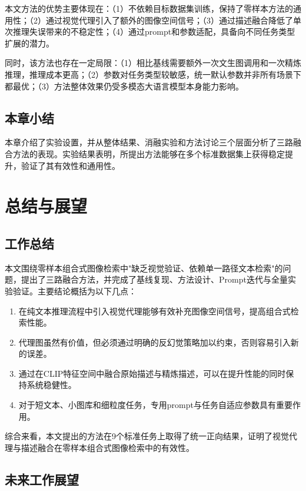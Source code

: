 \documentclass[12pt,a4paper,UTF8,oneside,openany]{ctexrep}
\begin{document}
本文方法的优势主要体现在：（1）不依赖目标数据集训练，保持了零样本方法的通用性；（2）通过视觉代理引入了额外的图像空间信号；（3）通过描述融合降低了单次推理失误带来的不稳定性；（4）通过prompt和参数适配，具备向不同任务类型扩展的潜力。

同时，该方法也存在一定局限：（1）相比基线需要额外一次文生图调用和一次精炼推理，推理成本更高；（2）参数对任务类型较敏感，统一默认参数并非所有场景下都最优；（3）方法整体效果仍受多模态大语言模型本身能力影响。

\section{本章小结}

本章介绍了实验设置，并从整体结果、消融实验和方法讨论三个层面分析了三路融合方法的表现。实验结果表明，所提出方法能够在多个标准数据集上获得稳定提升，验证了其有效性和通用性。


\chapter{总结与展望}

\section{工作总结}

本文围绕零样本组合式图像检索中"缺乏视觉验证、依赖单一路径文本检索"的问题，提出了三路融合方法，并完成了基线复现、方法设计、Prompt迭代与全量实验验证。主要结论概括为以下几点：
\begin{enumerate}[leftmargin=2\ccwd]
  \item 在纯文本推理流程中引入视觉代理能够有效补充图像空间信号，提高组合式检索性能。
  \item 代理图虽然有价值，但必须通过明确的反幻觉策略加以约束，否则容易引入新的误差。
  \item 通过在CLIP特征空间中融合原始描述与精炼描述，可以在提升性能的同时保持系统稳健性。
  \item 对于短文本、小图库和细粒度任务，专用prompt与任务自适应参数具有重要作用。
\end{enumerate}

综合来看，本文提出的方法在9个标准任务上取得了统一正向结果，证明了视觉代理与描述融合在零样本组合式图像检索中的有效性。

\section{未来工作展望}
\end{document}

